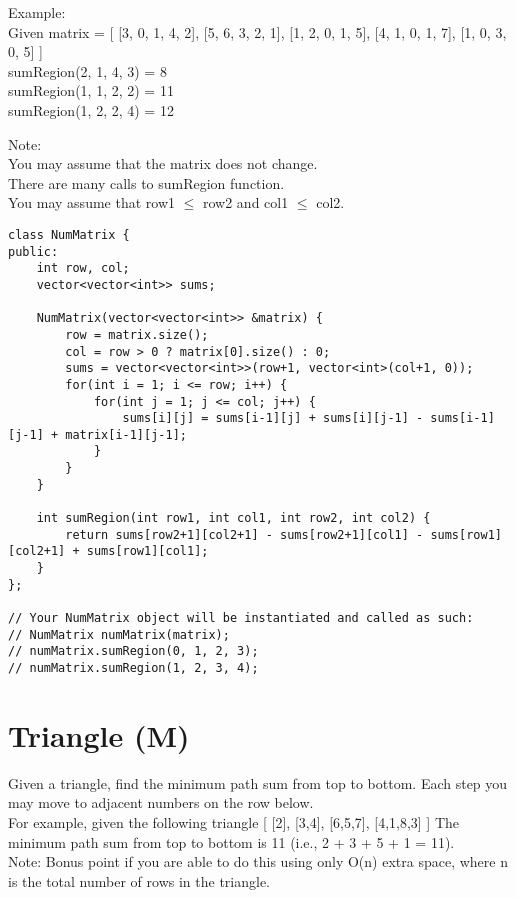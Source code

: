 Example:\\
Given matrix = [
  [3, 0, 1, 4, 2], 
  [5, 6, 3, 2, 1], 
  [1, 2, 0, 1, 5], 
  [4, 1, 0, 1, 7], 
  [1, 0, 3, 0, 5] 
]\\
sumRegion(2, 1, 4, 3) = 8\\
sumRegion(1, 1, 2, 2) = 11\\
sumRegion(1, 2, 2, 4) = 12\

Note:\\
    You may assume that the matrix does not change.\\
    There are many calls to sumRegion function.\\
    You may assume that row1 $\leq$ row2 and col1 $\leq$ col2.\\


\begin{lstlisting}
class NumMatrix {
public:
    int row, col;
    vector<vector<int>> sums;
    
    NumMatrix(vector<vector<int>> &matrix) {
        row = matrix.size();
        col = row > 0 ? matrix[0].size() : 0;
        sums = vector<vector<int>>(row+1, vector<int>(col+1, 0));
        for(int i = 1; i <= row; i++) {
            for(int j = 1; j <= col; j++) {
                sums[i][j] = sums[i-1][j] + sums[i][j-1] - sums[i-1][j-1] + matrix[i-1][j-1];
            }
        }
    }

    int sumRegion(int row1, int col1, int row2, int col2) {
        return sums[row2+1][col2+1] - sums[row2+1][col1] - sums[row1][col2+1] + sums[row1][col1];
    }
};

// Your NumMatrix object will be instantiated and called as such:
// NumMatrix numMatrix(matrix);
// numMatrix.sumRegion(0, 1, 2, 3);
// numMatrix.sumRegion(1, 2, 3, 4);
\end{lstlisting}


\section{Triangle (M)}
Given a triangle, find the minimum path sum from top to bottom. Each step you may move to adjacent numbers on the row below.\\

For example, given the following triangle
[
     [2],
    [3,4],
   [6,5,7],
  [4,1,8,3]
]
The minimum path sum from top to bottom is 11 (i.e., 2 + 3 + 5 + 1 = 11).\\

Note:
Bonus point if you are able to do this using only O(n) extra space, where n is the total number of rows in the triangle. \\

